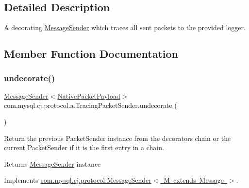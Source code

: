 \subsection{Detailed Description}
A decorating \mbox{\hyperlink{interfacecom_1_1mysql_1_1cj_1_1protocol_1_1_message_sender}{Message\+Sender}} which traces all sent packets to the provided logger. 

\subsection{Member Function Documentation}
\mbox{\label{classcom_1_1mysql_1_1cj_1_1protocol_1_1a_1_1_tracing_packet_sender_aed3dc47d6e7a4dad4761e05b2f9213de}} 
\subsubsection{\texorpdfstring{undecorate()}{undecorate()}}
{\footnotesize\ttfamily \mbox{\hyperlink{interfacecom_1_1mysql_1_1cj_1_1protocol_1_1_message_sender}{Message\+Sender}}$<$\mbox{\hyperlink{classcom_1_1mysql_1_1cj_1_1protocol_1_1a_1_1_native_packet_payload}{Native\+Packet\+Payload}}$>$ com.\+mysql.\+cj.\+protocol.\+a.\+Tracing\+Packet\+Sender.\+undecorate (\begin{DoxyParamCaption}{ }\end{DoxyParamCaption})}

Return the previous Packet\+Sender instance from the decorators chain or the current Packet\+Sender if it is the first entry in a chain.

\begin{DoxyReturn}{Returns}
\mbox{\hyperlink{interfacecom_1_1mysql_1_1cj_1_1protocol_1_1_message_sender}{Message\+Sender}} instance 
\end{DoxyReturn}


Implements \mbox{\hyperlink{interfacecom_1_1mysql_1_1cj_1_1protocol_1_1_message_sender_a3a352bf35ad98dc6cea7c1f4ac9480da}{com.\+mysql.\+cj.\+protocol.\+Message\+Sender$<$ M extends Message $>$}}.

\mbox{\label{classcom_1_1mysql_1_1cj_1_1protocol_1_1a_1_1_tracing_packet_sender_a57670e7bdafb2dd88cb711fb7e60266d}} 
